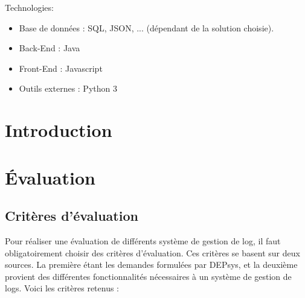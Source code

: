 \documentclass[paper=a4, fontsize=11pt]{scrartcl}
\begin{document}
Technologies:

\begin{itemize}
    \item Base de données : SQL, JSON, ... (dépendant de la solution choisie).
    \item Back-End : Java
    \item Front-End : Javascript 
    \item Outils externes : Python 3
\end{itemize}
\newpage

\renewcommand{\contentsname}{Table des matières}
\tableofcontents

\newpage

\section{Introduction}
\section{Évaluation}

\subsection{Critères d'évaluation}

Pour réaliser une évaluation de différents système de gestion de log, il faut obligatoirement choisir des critères d'évaluation. Ces critères se basent sur deux sources. La première étant les demandes formulées par DEPsys, et la deuxième provient des différentes fonctionnalités nécessaires à un système de gestion de logs. Voici les critères retenus :
\end{document}
